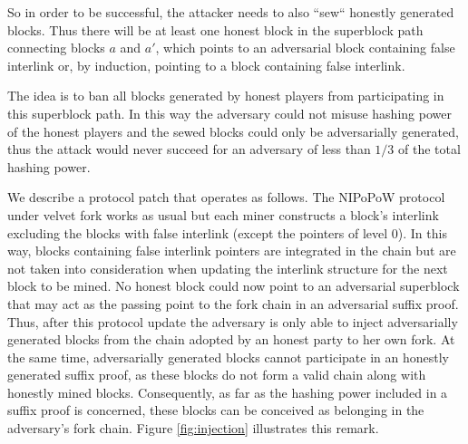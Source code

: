 So in order to be successful, the attacker needs to also ``sew`` honestly generated
blocks. Thus there will be at least one honest block in the superblock path
connecting blocks $a$ and $a'$, which points to an adversarial block containing
false interlink or, by induction, pointing to a block containing false interlink.

The idea is to ban all blocks generated by honest players from participating in
this superblock path. In this way the adversary could not misuse hashing power of
the honest players and the sewed blocks could only be adversarially generated,
thus the attack would never succeed for an adversary of less than $1/3$ of the
total hashing power.

We describe a protocol patch that operates as follows. The NIPoPoW protocol under
velvet fork works as usual but each miner constructs a block's interlink excluding
the blocks with false interlink (except the pointers of level 0). In this way,
blocks containing false interlink pointers are integrated in the chain but are
not taken into consideration when updating the interlink structure for the next
block to be mined. No honest block could now point to an adversarial superblock
that may act as the passing point to the fork chain in an adversarial suffix proof.
Thus, after this protocol update the adversary is only able to inject adversarially
generated blocks from the chain adopted by an honest party to her own fork.
At the same time, adversarially generated blocks cannot participate in an honestly
generated suffix proof, as these blocks do not form a valid chain along with
honestly mined blocks. Consequently, as far as the hashing power included in a
suffix proof is concerned, these blocks can be conceived as belonging in the
adversary's fork chain. Figure \ref{fig:injection} illustrates this remark.\\

